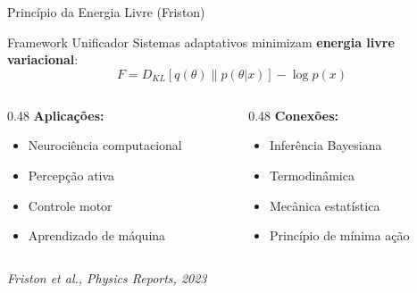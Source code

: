 \documentclass[aspectratio=169,12pt]{beamer}
\begin{document}
\begin{frame}{Princípio da Energia Livre (Friston)}
    \begin{block}{Framework Unificador}
        Sistemas adaptativos minimizam \textbf{energia livre variacional}:
        \begin{equation*}
            F = D_{KL}[q(\theta) \| p(\theta | x)] - \log p(x)
        \end{equation*}
    \end{block}

    \begin{columns}[T]
        \begin{column}{0.48\textwidth}
            \textbf{Aplicações:}
            \begin{itemize}
                \item Neurociência computacional
                \item Percepção ativa
                \item Controle motor
                \item Aprendizado de máquina
            \end{itemize}
        \end{column}
        \begin{column}{0.48\textwidth}
            \textbf{Conexões:}
            \begin{itemize}
                \item Inferência Bayesiana
                \item Termodinâmica
                \item Mecânica estatística
                \item Princípio de mínima ação
            \end{itemize}
        \end{column}
    \end{columns}

    \vspace{0.3cm}
    \begin{center}
        \textit{Friston et al., Physics Reports, 2023}
    \end{center}
\end{frame}
\end{document}
